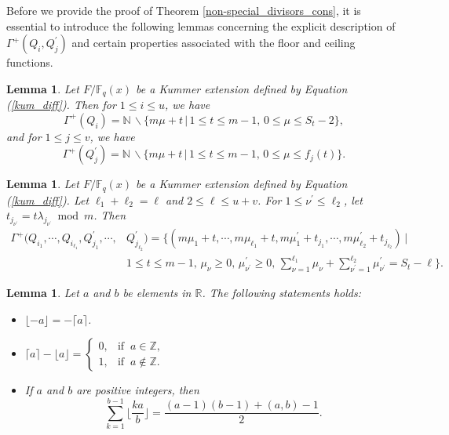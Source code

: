 \documentclass[journal,12pt,onecolumn]{IEEEtran}
\newtheorem{lemma}[theorem]{Lemma}
\begin{document}
Before we provide the proof of Theorem \ref{non-special_divisors_cons}, it is essential to introduce the following lemmas concerning the explicit description of $\Gamma^+(Q_i,Q_j^\prime)$ and certain properties associated with the floor and ceiling functions.

\begin{lemma}\cite[Prop. 3.12]{castellanosWeierstrassSemigroupsPure2024}\label{mini_gen_set_1}
    Let $F/\mathbb{F}_q(x)$ be a Kummer extension defined by Equation (\ref{kum_diff}). Then for $1\le i\le u$, we have 
    \[
        \Gamma^+(Q_i)=\mathbb{N}\,\backslash\Big\{m\mu+t \,\Big|\, 1\le t\le m-1,\,0\le \mu\le S_t-2\Big\}, 
    \]
    and for $1\le j\le v$, we have 
    \[
        \Gamma^+(Q_j^\prime)=\mathbb{N}\,\backslash\Big\{m\mu+t \,\Big|\, 1\le t\le m-1,\,0\le \mu\le f_j(t)\Big\}. 
    \]
\end{lemma}


\begin{lemma}\cite[Cor. 3.5]{castellanos2025generalizedweierstrasssemigroupsarbitrary}\label{mini_gen_set_mul}
    Let $F/\mathbb{F}_q(x)$ be a Kummer extension defined by Equation (\ref{kum_diff}). Let $\ell_1+\ell_2=\ell$ and $2\le\ell\le u+v$. For $1\le \nu^\prime\le \ell_2$, let $t_{j_{\nu^\prime}} = t\lambda_{j_{\nu^\prime}} \bmod m$. Then  
    \begin{align*}
        \Gamma^+(Q_{i_1},\cdots,Q_{i_{\ell_1}},Q_{j_1}^\prime,\cdots,&Q_{j_{\ell_2}}^\prime)=\Big\{(m\mu_1+t,\cdots,m\mu_{\ell_1}+t,m\mu^\prime_1+t_{j_1},\cdots,m\mu_{\ell_2}^\prime+t_{j_{\ell_2}})\,\Big|\\
        & 1\le t \le m-1,\,\mu_\nu\ge0,\,\mu_{\nu^\prime}^\prime\ge0,\,\sum_{\nu=1}^{\ell_1}\mu_\nu+\sum_{\nu^\prime=1}^{\ell_2}\mu_{\nu^\prime}^\prime=S_t -\ell\Big\}.
    \end{align*}
\end{lemma}

\begin{lemma}\cite[Lem. 4.1]{castellanosWeierstrassSemigroupsPure2024}\label{inter}
    Let $a$ and $b$ be elements in $\mathbb{R}$. The following statements holds:
    \begin{itemize}
        \item[(i)] $\lfloor-a\rfloor = -\lceil a\rceil$.
        \item[(ii)] $\lceil a\rceil - \lfloor a \rfloor = \begin{cases}
            0, &\text{if}\;\;a\in\mathbb{Z},\\
            1, &\text{if}\;\;a\notin\mathbb{Z}.
        \end{cases}$
        \item[(iii)] If $a$ and $b$ are positive integers, then
        \[
            \sum_{k=1}^{b-1}\bigg\lfloor\frac{ka}{b}\bigg\rfloor=\frac{(a-1)(b-1)+(a,b)-1}{2}.
        \]
    \end{itemize}
\end{lemma}
\end{document}
